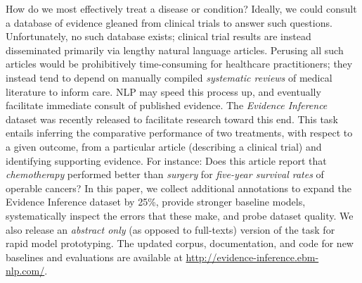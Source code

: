 How do we most effectively treat a disease or condition? Ideally, we could consult a database of evidence gleaned from clinical trials to answer such questions. Unfortunately, no such database exists; clinical trial results are instead disseminated primarily via lengthy natural language articles. Perusing all such articles would be prohibitively time-consuming for healthcare practitioners; they instead tend to depend on manually compiled \emph{systematic reviews} of medical literature to inform care. NLP may speed this process up, and eventually facilitate immediate consult of published evidence. The \emph{Evidence Inference} dataset was recently released to facilitate research toward this end. This task entails inferring the comparative performance of two treatments, with respect to a given outcome, from a particular article (describing a clinical trial) and identifying supporting evidence. For instance: Does this article report that \textit{chemotherapy} performed better than \textit{surgery} for \textit{five-year survival rates} of operable cancers? In this paper, we collect additional annotations to expand the Evidence Inference dataset by 25\%, provide stronger baseline models, systematically inspect the errors that these make, and probe dataset quality. We also release an \emph{abstract only} (as opposed to full-texts) version of the task for rapid model prototyping. The updated corpus, documentation, and code for new baselines and evaluations are available at \url{http://evidence-inference.ebm-nlp.com/}.
